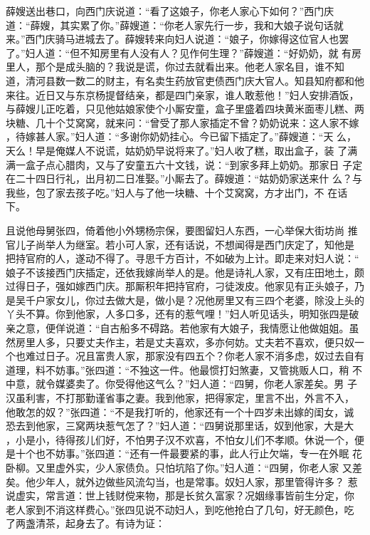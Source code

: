 薛嫂送出巷口，向西门庆说道：“看了这娘子，你老人家心下如何？”西门庆
道：“薛嫂，其实累了你。”薛嫂道：“你老人家先行一步，我和大娘子说句话就
来。”西门庆骑马进城去了。薛嫂转来向妇人说道：“娘子，你嫁得这位官人也罢
了。”妇人道：“但不知房里有人没有人？见作何生理？”薛嫂道：“好奶奶，就
有房里人，那个是成头脑的？我说是谎，你过去就看出来。他老人家名目，谁不知
道，清河县数一数二的财主，有名卖生药放官吏债西门庆大官人。知县知府都和他
来往。近日又与东京杨提督结亲，都是四门亲家，谁人敢惹他！”妇人安排酒饭，
与薛嫂儿正吃着，只见他姑娘家使个小厮安童，盒子里盛着四块黄米面枣儿糕、两
块糖、几十个艾窝窝，就来问：“曾受了那人家插定不曾？奶奶说来：这人家不嫁
，待嫁甚人家。”妇人道：“多谢你奶奶挂心。今已留下插定了。”薛嫂道：“天
么，天么！早是俺媒人不说谎，姑奶奶早说将来了。”妇人收了糕，取出盒子，装
了满满一盒子点心腊肉，又与了安童五六十文钱，说：“到家多拜上奶奶。那家日
子定在二十四日行礼，出月初二日准娶。”小厮去了。薛嫂道：“姑奶奶家送来什
么？与我些，包了家去孩子吃。”妇人与了他一块糖、十个艾窝窝，方才出门，不
在话下。

且说他母舅张四，倚着他小外甥杨宗保，要图留妇人东西，一心举保大街坊尚
推官儿子尚举人为继室。若小可人家，还有话说，不想闻得是西门庆定了，知他是
把持官府的人，遂动不得了。寻思千方百计，不如破为上计。即走来对妇人说：“
娘子不该接西门庆插定，还依我嫁尚举人的是。他是诗礼人家，又有庄田地土，颇
过得日子，强如嫁西门庆。那厮积年把持官府，刁徒泼皮。他家见有正头娘子，乃
是吴千户家女儿，你过去做大是，做小是？况他房里又有三四个老婆，除没上头的
丫头不算。你到他家，人多口多，还有的惹气哩！”妇人听见话头，明知张四是破
亲之意，便佯说道：“自古船多不碍路。若他家有大娘子，我情愿让他做姐姐。虽
然房里人多，只要丈夫作主，若是丈夫喜欢，多亦何妨。丈夫若不喜欢，便只奴一
个也难过日子。况且富贵人家，那家没有四五个？你老人家不消多虑，奴过去自有
道理，料不妨事。”张四道：“不独这一件。他最惯打妇煞妻，又管挑贩人口，稍
不中意，就令媒婆卖了。你受得他这气么？”妇人道：“四舅，你老人家差矣。男
子汉虽利害，不打那勤谨省事之妻。我到他家，把得家定，里言不出，外言不入，
他敢怎的奴？”张四道：“不是我打听的，他家还有一个十四岁未出嫁的闺女，诚
恐去到他家，三窝两块惹气怎了？”妇人道：“四舅说那里话，奴到他家，大是大
，小是小，待得孩儿们好，不怕男子汉不欢喜，不怕女儿们不孝顺。休说一个，便
是十个也不妨事。”张四道：“还有一件最要紧的事，此人行止欠端，专一在外眠
花卧柳。又里虚外实，少人家债负。只怕坑陷了你。”妇人道：“四舅，你老人家
又差矣。他少年人，就外边做些风流勾当，也是常事。奴妇人家，那里管得许多？
惹说虚实，常言道：世上钱财傥来物，那是长贫久富家？况姻缘事皆前生分定，你
老人家到不消这样费心。”张四见说不动妇人，到吃他抢白了几句，好无颜色，吃
了两盏清茶，起身去了。有诗为证：


